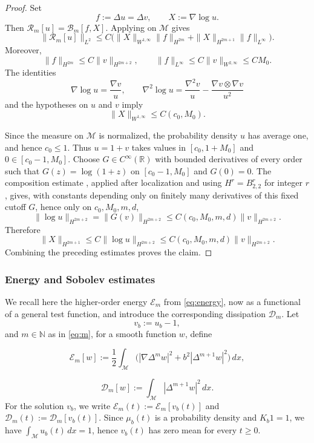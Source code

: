 \documentclass[11pt]{article}
\theoremstyle{definition}
\newcommand{\R}{\mathbb{R}}
\def\M{\mathcal M}
\begin{document}
\begin{proof}
Set
\[
f:=\Delta u=\Delta v,
\qquad
X:=\nabla\log u .
\]
Then $\mathcal R_m[u]=\mathcal B_m[f,X]$.  Applying
 on $\mathcal{M}$ gives
\[
\|\mathcal R_m[u]\|_{L^2}
\le
C
\bigl(
\|X\|_{W^{1,\infty}}\|f\|_{H^{2m}}
+
\|X\|_{H^{2m+1}}\|f\|_{L^\infty}
\bigr).
\]
Moreover,
\[
\|f\|_{H^{2m}}\le C\|v\|_{H^{2m+2}},
\qquad
\|f\|_{L^\infty}\le C\|v\|_{W^{2,\infty}}\le CM_0.
\]
The identities
\[
\nabla\log u=\frac{\nabla v}{u},
\qquad
\nabla^2\log u
=
\frac{\nabla^2v}{u}
-
\frac{\nabla v\otimes\nabla v}{u^2}
\]
and the hypotheses on $u$ and $v$ imply
\[
\|X\|_{W^{1,\infty}}\le C(c_0,M_0).
\]

Since the measure on $\mathcal{M}$ is normalized, the probability density
$u$ has average one, and hence $c_0\le1$.  Thus $u=1+v$ takes values in
$[c_0,1+M_0]$ and $0\in[c_0-1,M_0]$.  Choose
$G\in C^\infty(\R)$ with bounded derivatives of every order such that
$G(z)=\log(1+z)$ on $[c_0-1,M_0]$ and $G(0)=0$.  The composition estimate
\cite[Theorem~2.87]{bahouri2011fourier}, applied after localization and using
$H^r=B^r_{2,2}$ for integer $r$, gives, with constants depending only on
finitely many derivatives of this fixed cutoff \(G\), hence only on
\(c_0,M_0,m,d\),
\[
\|\log u\|_{H^{2m+2}}
=
\|G(v)\|_{H^{2m+2}}
\le
C(c_0,M_0,m,d)\|v\|_{H^{2m+2}}.
\]
Therefore
\[
\|X\|_{H^{2m+1}}
\le
C\|\log u\|_{H^{2m+2}}
\le
C(c_0,M_0,m,d)\|v\|_{H^{2m+2}}.
\]
Combining the preceding estimates proves the claim.
\end{proof}


\subsubsection{Energy and Sobolev estimates}
\label{sec:sobolev}

 We recall here the higher-order energy $\mathcal E_m$ from \eqref{eq:energy},
now as a functional of a general test function, and introduce the corresponding
dissipation $\mathcal D_m$. 
Let
\[
v_b := u_b - 1,
\]
and $m\in \mathbb{N}$ as in \eqref{eq:m}, for a smooth function $w$, define

\[
\mathcal E_m[w]
:=
\frac12
\int_{ \M}
\bigl(
|\nabla \Delta^m w|^2
+
b^2 |\Delta^{m+1} w|^2
\bigr)\, dx,
\]

\[
\mathcal D_m[w]
:=
\int_{ \M}
|\Delta^{m+1} w|^2\, dx.
\]
For the solution $v_b$, we write $\mathcal E_m(t) := \mathcal E_m[v_b(t)]$ and $\mathcal D_m(t) := \mathcal D_m[v_b(t)]$. Since $\mu_b(t)$ is a probability density and $K_b 1 = 1$, we have $\int_{ \M} u_b(t)\, dx = 1$, hence $v_b(t)$ has zero mean for every $t \ge 0$.
\end{document}
